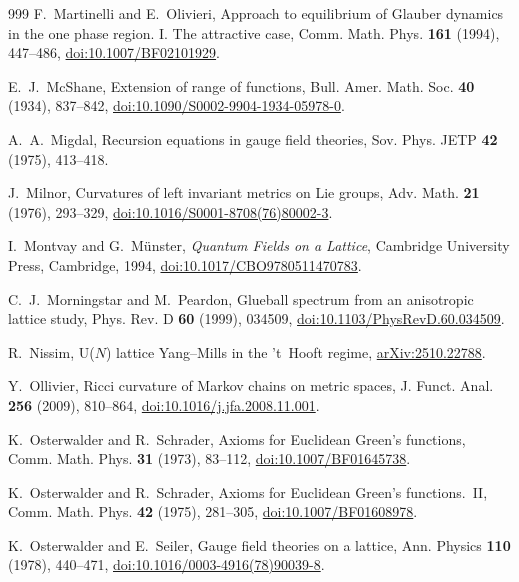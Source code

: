 \documentclass[aps,prd,twocolumn,superscriptaddress,nofootinbib,longbibliography,floatfix,amsmath,amssymb,10pt]{revtex4-2}
\theoremstyle{definition}
\theoremstyle{remark}
\begin{document}
\begin{thebibliography}{999}
F.~Martinelli and E.~Olivieri, Approach to equilibrium of Glauber dynamics
in the one phase region. I. The attractive case, Comm. Math. Phys.
\textbf{161} (1994), 447--486,
\href{https://doi.org/10.1007/BF02101929}{doi:10.1007/BF02101929}.

E.~J.~McShane, Extension of range of functions, Bull. Amer. Math. Soc.
\textbf{40} (1934), 837--842,
\href{https://doi.org/10.1090/S0002-9904-1934-05978-0}
{doi:10.1090/S0002-9904-1934-05978-0}.

A.~A.~Migdal, Recursion equations in gauge field theories, Sov. Phys. JETP
\textbf{42} (1975), 413--418.

J.~Milnor, Curvatures of left invariant metrics on Lie groups, Adv. Math.
\textbf{21} (1976), 293--329,
\href{https://doi.org/10.1016/S0001-8708(76)80002-3}{doi:10.1016/S0001-8708(76)80002-3}.

I.~Montvay and G.~M\"unster, \emph{Quantum Fields on a Lattice}, Cambridge
University Press, Cambridge, 1994,
\href{https://doi.org/10.1017/CBO9780511470783}{doi:10.1017/CBO9780511470783}.

C.~J.~Morningstar and M.~Peardon, Glueball spectrum from an anisotropic
lattice study, Phys. Rev. D \textbf{60} (1999), 034509,
\href{https://doi.org/10.1103/PhysRevD.60.034509}{doi:10.1103/PhysRevD.60.034509}.

R.~Nissim, U($N$) lattice Yang--Mills in the 't~Hooft regime,
\href{https://arxiv.org/abs/2510.22788}{arXiv:2510.22788}.

Y.~Ollivier, Ricci curvature of Markov chains on metric spaces, J. Funct.
Anal. \textbf{256} (2009), 810--864,
\href{https://doi.org/10.1016/j.jfa.2008.11.001}{doi:10.1016/j.jfa.2008.11.001}.

K.~Osterwalder and R.~Schrader, Axioms for Euclidean Green's functions,
Comm. Math. Phys. \textbf{31} (1973), 83--112,
\href{https://doi.org/10.1007/BF01645738}{doi:10.1007/BF01645738}.

K.~Osterwalder and R.~Schrader, Axioms for Euclidean Green's functions.~II,
Comm. Math. Phys. \textbf{42} (1975), 281--305,
\href{https://doi.org/10.1007/BF01608978}{doi:10.1007/BF01608978}.

K.~Osterwalder and E.~Seiler, Gauge field theories on a lattice, Ann. Physics
\textbf{110} (1978), 440--471,
\href{https://doi.org/10.1016/0003-4916(78)90039-8}{doi:10.1016/0003-4916(78)90039-8}.


\end{thebibliography}
\end{document}
